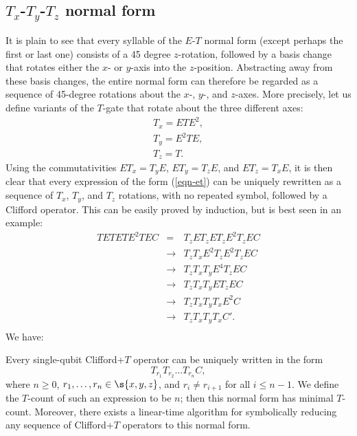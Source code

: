 \documentclass{article}
\begin{document}
\subsection{$T_x$-$T_y$-$T_z$ normal form}

It is plain to see that every syllable of the $E$-$T$ normal form
(except perhaps the first or last one) consists of a 45 degree
$z$-rotation, followed by a basis change that rotates either the $x$-
or $y$-axis into the $z$-position. Abstracting away from these basis
changes, the entire normal form can therefore be regarded as a
sequence of 45-degree rotations about the $x$-, $y$-, and $z$-axes.
More precisely, let us define variants of the $T$-gate that rotate
about the three different axes:
\[ \begin{array}{l}
  T_x = ETE^2, \\
  T_y = E^2TE, \\
  T_z = T.
\end{array}
\]
Using the commutativities $ET_x = T_yE$, $ET_y = T_zE$, and $ET_z =
T_xE$, it is then clear that every expression of the form
(\ref{eqn-et}) can be uniquely rewritten as a sequence of $T_x$,
$T_y$, and $T_z$ rotations, with no repeated symbol, followed by a
Clifford operator. This can be easily proved by induction, but is best
seen in an example:
\[ \begin{array}{rcl}
  TETETE^2TEC
  &=& T_zET_zET_zE^2T_zEC \\
  &\rightarrow& T_zT_xE^2T_zE^2T_zEC \\
  &\rightarrow& T_zT_xT_yE^4T_zEC \\
  &\rightarrow& T_zT_xT_yET_zEC \\
  &\rightarrow& T_zT_xT_yT_xE^2C \\
  &\rightarrow& T_zT_xT_yT_xC'. \\
\end{array}
\]
We have:
\begin{proposition}
  Every single-qubit Clifford+$T$ operator can be uniquely written in
  the form
  \[  T_{r_1}T_{r_2}\ldots T_{r_n} C,
  \]
  where $n\geq 0$, $r_1,\ldots,r_n\in\s{x,y,z}$, and $r_i\neq r_{i+1}$
  for all $i\leq n-1$. We define the $T$-count of such an expression
  to be $n$; then this normal form has minimal $T$-count. Moreover,
  there exists a linear-time algorithm for symbolically reducing any
  sequence of Clifford+$T$ operators to this normal form.
\end{proposition}
\end{document}
